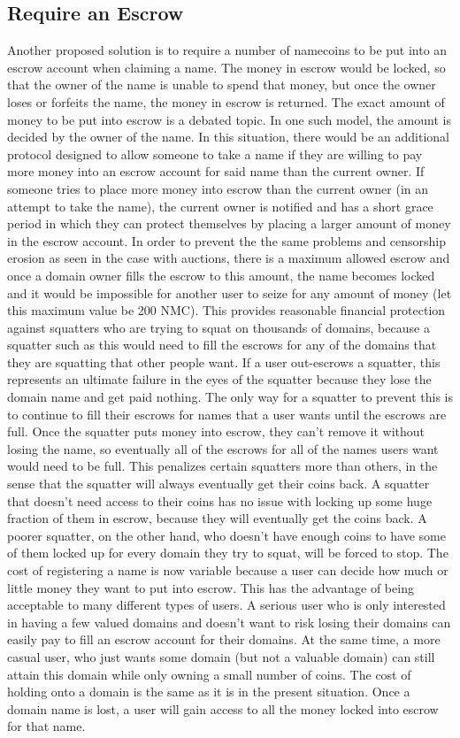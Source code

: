 \subsection{Require an Escrow}
    Another proposed solution is to require a number of namecoins to be put into an escrow account when claiming a name. The money in escrow would be locked, so that the owner of the name is unable to spend that money, but once the owner loses or forfeits the name, the money in escrow is returned. The exact amount of money to be put into escrow is a debated topic. In one such model, the amount is decided by the owner of the name. In this situation, there would be an additional protocol designed to allow someone to take a name if they are willing to pay more money into an escrow account for said name than the current owner. If someone tries to place more money into escrow than the current owner (in an attempt to take the name), the current owner is notified and has a short grace period in which they can protect themselves by placing a larger amount of money in the escrow account. In order to prevent the the same problems and censorship erosion as seen in the case with auctions, there is a maximum allowed escrow and once a domain owner fills the escrow to this amount, the name becomes locked and it would be impossible for another user to seize for any amount of money (let this maximum value be 200 NMC). This provides reasonable financial protection against squatters who are trying to squat on thousands of domains, because a squatter such as this would need to fill the escrows for any of the domains that they are squatting that other people want. If a user out-escrows a squatter, this represents an ultimate failure in the eyes of the squatter because they lose the domain name and get paid nothing. The only way for a squatter to prevent this is to continue to fill their escrows for names that a user wants until the escrows are full. Once the squatter puts money into escrow, they can't remove it without losing the name, so eventually all of the escrows for all of the names users want would need to be full. This penalizes certain squatters more than others, in the sense that the squatter will always eventually get their coins back. A squatter that doesn't need access to their coins has no issue with locking up some huge fraction of them in escrow, because they will eventually get the coins back. A poorer squatter, on the other hand, who doesn't have enough coins to have some of them locked up for every domain they try to squat, will be forced to stop. 
    The cost of registering a name is now variable because a user can decide how much or little money they want to put into escrow. This has the advantage of being acceptable to many different types of users. A serious user who is only interested in having a few valued domains and doesn't want to risk losing their domains can easily pay to fill an escrow account for their domains. At the same time, a more casual user, who just wants some domain (but not a valuable domain) can still attain this domain while only owning a small number of coins. The cost of holding onto a domain is the same as it is in the present situation. Once a domain name is lost, a user will gain access to all the money locked into escrow for that name.     

